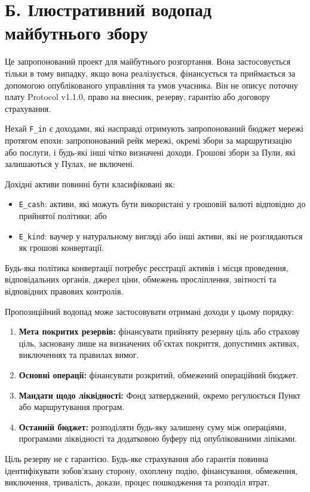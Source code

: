 \documentclass[11pt]{article}
\begin{document}
\section*{Б. Ілюстративний водопад майбутнього збору}

Це запропонований проект для майбутнього розгортання. Вона застосовується тільки в тому випадку, якщо вона реалізується, фінансується та приймається за допомогою опублікованого управління та умов учасника. Він не описує поточну плату Protocol v1.1.0, право на внесник, резерву, гарантію або договору страхування.

Нехай \texttt{F\_in} є доходами, які насправді отримують запропонований бюджет мережі протягом епохи: запропонований рейк мережі, окремі збори за маршрутизацію або послуги, і будь-які інші чітко визначені доходи. Грошові збори за Пули, які залишаються у Пулах, не включені.

Дохідні активи повинні бути класифіковані як:

\begin{itemize}[leftmargin=*]
\item \texttt{E\_cash}: активи, які можуть бути використані у грошовій валюті відповідно до прийнятої політики; або
\item \texttt{E\_kind}: ваучер у натуральному вигляді або інші активи, які не розглядаються як грошові конвертації.
\end{itemize}
Будь-яка політика конвертації потребує реєстрації активів і місця проведення, відповідальних органів, джерел ціни, обмежень просліплення, звітності та відповідних правових контролів.

Пропозиційний водопад може застосовувати отримані доходи у цьому порядку:

\begin{enumerate}[leftmargin=*]
\item \textbf{Мета покритих резервів:} фінансувати прийняту резервну ціль або страхову ціль, засновану лише на визначених об'єктах покриття, допустимих активах, виключеннях та правилах вимог.
\item \textbf{Основні операції:} фінансувати розкритий, обмежений операційний бюджет.
\item \textbf{Мандати щодо ліквідності:} Фонд затверджений, окремо регулюється Пункт або маршрутування програм.
\item \textbf{Останній бюджет:} розподіляти будь-яку залишену суму між операціями, програмами ліквідності та додатковою буферу під опублікованими ліпіками.
\end{enumerate}
Ціль резерву не є гарантією. Будь-яке страхування або гарантія повинна ідентифікувати зобов'язану сторону, охоплену подію, фінансування, обмеження, виключення, тривалість, докази, процес пошкодження та розподіл втрат.
\end{document}
